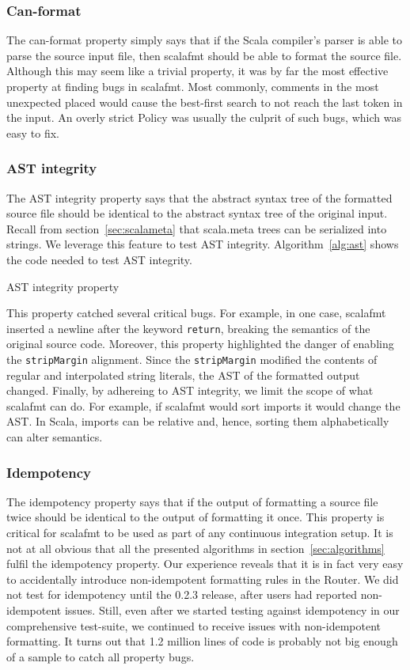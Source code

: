 \subsubsection{Can-format}
The can-format property simply says that if the Scala compiler's parser is able to parse the source input file, then scalafmt should be able to format the source file.
Although this may seem like a trivial property, it was by far the most effective property at finding bugs in scalafmt.
Most commonly, comments in the most unexpected placed would cause the best-first search to not reach the last token in the input.
An overly strict Policy was usually the culprit of such bugs, which was easy to fix.

\subsubsection{AST integrity}
The AST integrity property says that the abstract syntax tree of the formatted source file should be identical to the abstract syntax tree of the original input.
Recall from section~\ref{sec:scalameta} that scala.meta trees can be serialized into strings.
We leverage this feature to test AST integrity.
Algorithm~\ref{alg:ast} shows the code needed to test AST integrity.
\begin{algorithm}
  \caption{AST integrity property}\label{alg:ast}
  
\end{algorithm}
This property catched several critical bugs.
For example, in one case, scalafmt inserted a newline after the keyword \texttt{return}, breaking the semantics of the original source code.
Moreover, this property highlighted the danger of enabling the \texttt{stripMargin} alignment.
Since the \texttt{stripMargin} modified the contents of regular and interpolated string literals,
the AST of the formatted output changed.
Finally, by adhereing to AST integrity, we limit the scope of what scalafmt can do.
For example, if scalafmt would sort imports it would change the AST.
In Scala, imports can be relative and, hence, sorting them alphabetically can alter semantics.

\subsubsection{Idempotency}
The idempotency property says that if the output of formatting a source file twice should be identical to the output of formatting it once.
This property is critical for scalafmt to be used as part of any continuous integration setup.
It is not at all obvious that all the presented algorithms in section~\ref{sec:algorithms} fulfil the idempotency property.
Our experience reveals that it is in fact very easy to accidentally introduce non-idempotent formatting rules in the Router.
We did not test for idempotency until the 0.2.3 release, after users had reported non-idempotent issues.
Still, even after we started testing against idempotency in our comprehensive test-suite, we continued to receive issues with non-idempotent formatting.
It turns out that 1.2 million lines of code is probably not big enough of a sample to catch all property bugs.

